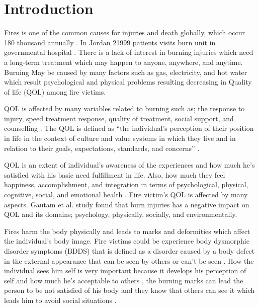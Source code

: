 \documentclass[10pt]{NSP1}
\begin{document}
	
	\maketitle
	
	\section{Introduction}
	Fires is one of the common causes for injuries and death globally, which occur 180 thousand annually \cite{WHO2023}. In Jordan 21999 patients visits burn unit in governmental hospital \cite{MOH2025}. There is a lack of interest in burning injuries which need a long-term treatment which may happen to anyone, anywhere, and anytime. Burning May be caused by many factors such as gas, electricity, and hot water which result psychological and physical problems resulting decreasing in Quality of life (QOL) among fire victims.
	
	QOL is affected by many variables related to burning such as; the response to injury, speed treatment response, quality of treatment, social support, and counselling \cite{Hunt2012}. The QOL is defined as “the individual's perception of their position in life in the context of culture and value systems in which they live and in relation to their goals, expectations, standards, and concerns” \cite{Ho2024}.
	
	QOL is an extent of individual's awareness of the experiences and how much he's satisfied with his basic need fulfillment in life. Also, how much they feel happiness, accomplishment, and integration in terms of psychological, physical, cognitive, social, and emotional health \cite{AlHarthi2017}. Fire victim's QOL is affected by many aspects. Gautam et al. \cite{Gautam2022} study found that burn injuries has a negative impact on QOL and its domains; psychology, physically, socially, and environmentally.
	
	Fires harm the body physically and leads to marks and deformities which affect the individual's body image. Fire victims could be experience body dysmorphic disorder symptoms (BDDS) that is defined as a disorder caused by a body defect in the external appearance that can be seen by others or can't be seen \cite{Ruck2024}. How the individual sees him self is very important because it develops his perception of self and how much he's acceptable to others \cite{Sreshta2017}, the burning marks can lead the person to be not satisfied of his body and they know that others can see it which leads him to avoid social situations \cite{Alhammadi2020}.
	
\end{document}
